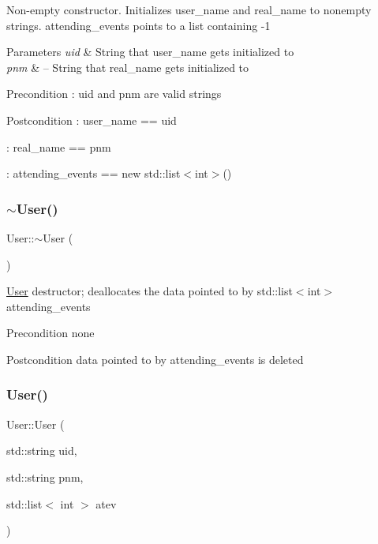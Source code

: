 Non-\/empty constructor. Initializes user\+\_\+name and real\+\_\+name to nonempty strings. attending\+\_\+events points to a list containing -\/1 
\begin{DoxyParams}{Parameters}
{\em uid} & String that user\+\_\+name gets initialized to \\
\hline
{\em pnm} & -- String that real\+\_\+name gets initialized to \\
\hline
\end{DoxyParams}
\begin{DoxyPrecond}{Precondition}
\+: uid and pnm are valid strings 
\end{DoxyPrecond}
\begin{DoxyPostcond}{Postcondition}
\+: user\+\_\+name == uid 

\+: real\+\_\+name == pnm 

\+: attending\+\_\+events == new std\+::list$<$int$>$() 
\end{DoxyPostcond}
\mbox{\label{class_user_ac00b72ad64eb4149f7b21b9f5468c2b2}} 
\subsubsection{\texorpdfstring{$\sim$\+User()}{~User()}}
{\footnotesize\ttfamily User\+::$\sim$\+User (\begin{DoxyParamCaption}{ }\end{DoxyParamCaption})}

\mbox{\hyperlink{class_user}{User}} destructor; deallocates the data pointed to by std\+::list$<$int$>$ attending\+\_\+events \begin{DoxyPrecond}{Precondition}
none 
\end{DoxyPrecond}
\begin{DoxyPostcond}{Postcondition}
data pointed to by attending\+\_\+events is deleted 
\end{DoxyPostcond}
\mbox{\label{class_user_abf30fe432e25c1d0c1ad60a50604bc92}} 
\subsubsection{\texorpdfstring{User()}{User()}\hspace{0.1cm}{\footnotesize\ttfamily [3/3]}}
{\footnotesize\ttfamily User\+::\+User (\begin{DoxyParamCaption}\item[{std\+::string}]{uid,  }\item[{std\+::string}]{pnm,  }\item[{std\+::list$<$ int $>$}]{atev }\end{DoxyParamCaption})}

